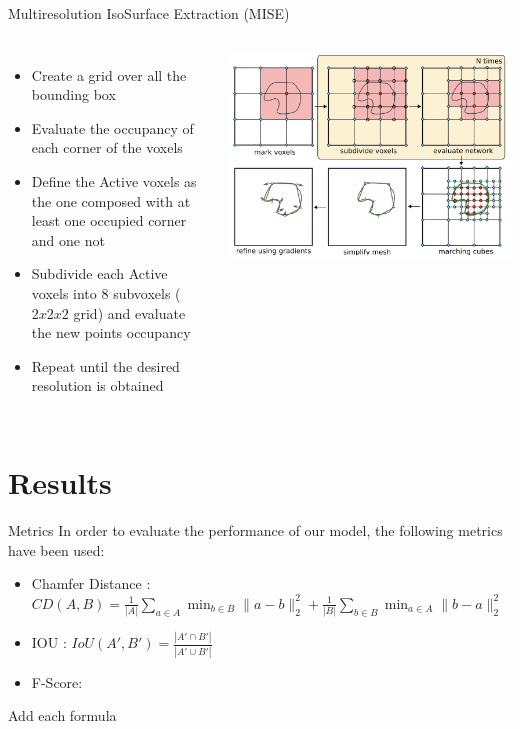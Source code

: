 \documentclass{beamer}
\begin{document}
\begin{frame}{Multiresolution IsoSurface Extraction (MISE)}
    \begin{columns}[T]
        \begin{itemize}
            \item Create a grid over all the bounding box 
            \item Evaluate the occupancy of each corner of the voxels
            \item Define the Active voxels as the one composed with at least one occupied corner and one not 
            \item Subdivide each Active voxels into 8 subvoxels ($2x2x2$ grid) and evaluate the new points occupancy
            \item Repeat until the desired resolution is obtained
        \end{itemize}
        \includegraphics[width=\linewidth]{../media/mise.png}
    \end{columns}
  \end{frame}

\section{Results}

\begin{frame}{Metrics}
In order to evaluate the performance of our model, the following metrics have been used:
\begin{itemize}
\item Chamfer Distance : \\ 
$
CD(A, B) = \frac{1}{|A|} \sum_{a \in A} \min_{b \in B} \|a - b\|_2^2 + \frac{1}{|B|} \sum_{b \in B} \min_{a \in A} \|b - a\|_2^2
$
\item IOU : 
$ IoU(A', B') = \frac{|A' \cap B'|}{|A' \cup B'|}$
\item F-Score:
\end{itemize}
Add each formula
\end{frame}
\end{document}
